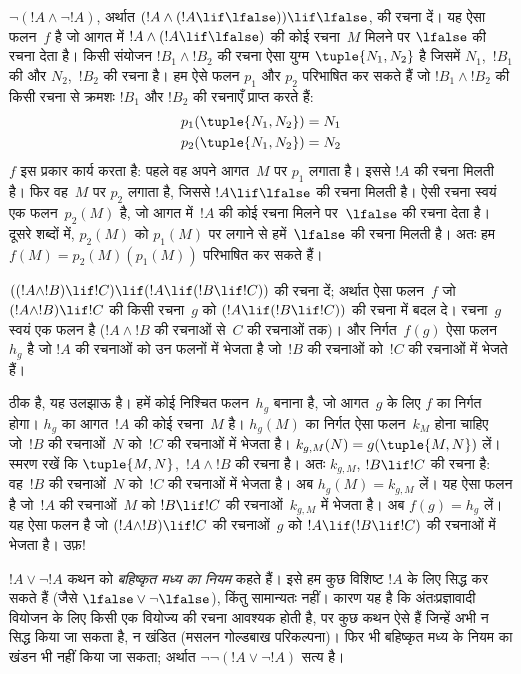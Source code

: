 \documentclass[../../../include/open-logic-section]{subfiles}
\begin{document}
\begin{ex}
$\lnot(!A \land \lnot !A)$, अर्थात
$(!A \land (!A \lif \lfalse)) \lif \lfalse$, की रचना दें। यह ऐसा फलन~$f$
है जो आगत में $!A \land (!A \lif \lfalse)$ की कोई रचना~$M$ मिलने पर
$\lfalse$ की रचना देता है। किसी संयोजन $!B_1 \land !B_2$ की रचना ऐसा युग्म
$\tuple{N_1, N_2}$ है जिसमें $N_1$,~$!B_1$ की और $N_2$,~$!B_2$ की रचना
है। हम ऐसे फलन $p_1$ और $p_2$ परिभाषित कर सकते हैं जो
$!B_1 \land !B_2$ की किसी रचना से क्रमशः $!B_1$ और $!B_2$ की रचनाएँ
प्राप्त करते हैं:
\begin{align*}
  p_1(\tuple{N_1, N_2}) &= N_1\\
  p_2(\tuple{N_1, N_2}) &= N_2
\end{align*}
$f$ इस प्रकार कार्य करता है: पहले वह अपने आगत~$M$ पर $p_1$ लगाता है। इससे
$!A$ की रचना मिलती है। फिर वह~$M$ पर $p_2$ लगाता है, जिससे
$!A \lif \lfalse$ की रचना मिलती है। ऐसी रचना स्वयं एक फलन~$p_2(M)$ है,
जो आगत में~$!A$ की कोई रचना मिलने पर~$\lfalse$ की रचना देता है। दूसरे
शब्दों में, $p_2(M)$ को $p_1(M)$ पर लगाने से हमें~$\lfalse$ की रचना मिलती
है। अतः हम $f(M) = p_2(M)(p_1(M))$ परिभाषित कर सकते हैं।
\end{ex}

\begin{ex}
$((!A \land !B) \lif !C) \lif (!A \lif (!B \lif !C))$ की रचना दें;
अर्थात ऐसा फलन~$f$ जो $(!A \land !B) \lif !C$ की किसी रचना~$g$ को
$(!A \lif (!B \lif !C))$ की रचना में बदल दे। रचना~$g$ स्वयं एक फलन है
($!A \land !B$ की रचनाओं से~$C$ की रचनाओं तक)। और निर्गत~$f(g)$ ऐसा
फलन~$h_g$ है जो $!A$ की रचनाओं को उन फलनों में भेजता है जो~$!B$ की रचनाओं
को~$!C$ की रचनाओं में भेजते हैं।

ठीक है, यह उलझाऊ है। हमें कोई निश्चित फलन~$h_g$ बनाना है, जो आगत~$g$ के
लिए $f$ का निर्गत होगा। $h_g$ का आगत~$!A$ की कोई रचना~$M$ है। $h_g(M)$
का निर्गत ऐसा फलन~$k_M$ होना चाहिए जो~$!B$ की रचनाओं~$N$ को~$!C$ की रचनाओं
में भेजता है। $k_{g,M}(N) = g(\tuple{M, N})$ लें। स्मरण रखें कि
$\tuple{M, N}$,~$!A \land !B$ की रचना है। अतः $k_{g,M}$,
$!B \lif !C$ की रचना है: वह~$!B$ की रचनाओं~$N$ को~$!C$ की रचनाओं में भेजता
है। अब $h_g(M) = k_{g,M}$ लें। यह ऐसा फलन है जो~$!A$ की रचनाओं~$M$ को
$!B \lif !C$ की रचनाओं~$k_{g,M}$ में भेजता है। अब $f(g) = h_g$ लें। यह
ऐसा फलन है जो $(!A \land !B) \lif !C$ की रचनाओं~$g$ को
$!A \lif (!B \lif !C)$ की रचनाओं में भेजता है। उफ़!{}
\end{ex}

$!A \lor \lnot !A$ कथन को \emph{बहिष्कृत मध्य का नियम} कहते हैं। इसे हम
कुछ विशिष्ट $!A$ के लिए सिद्ध कर सकते हैं (जैसे
$\lfalse \lor \lnot \lfalse$), किंतु सामान्यतः नहीं। कारण यह है कि
अंतःप्रज्ञावादी वियोजन के लिए किसी एक वियोज्य की रचना आवश्यक होती है, पर कुछ
कथन ऐसे हैं जिन्हें अभी न सिद्ध किया जा सकता है, न खंडित (मसलन गोल्डबाख
परिकल्पना)। फिर भी बहिष्कृत मध्य के नियम का खंडन भी नहीं किया जा सकता;
अर्थात $\lnot \lnot (!A \lor \lnot !A)$ सत्य है।
\end{document}
